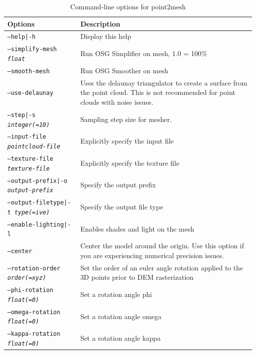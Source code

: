 \begin{longtable}{|l|p{10cm}|}
\caption{Command-line options for point2mesh}
\label{tbl:point2mesh}
\endfirsthead
\endhead
\endfoot
\endlastfoot
\hline
Options & Description \\ \hline \hline
\texttt{--help|-h} & Display this help \\ \hline
\texttt{--simplify-mesh \textit{float}} & Run OSG Simplifier on mesh, 1.0 = 100\% \\ \hline
\texttt{--smooth-mesh} & Run OSG Smoother on mesh \\ \hline
\texttt{--use-delaunay} & Uses the delaunay triangulator to create a surface from the point cloud. This is not recommended for point clouds with noise issues. \\ \hline
\texttt{--step|-s \textit{integer(=10)}} & Sampling step size for mesher. \\ \hline
\texttt{--input-file \textit{pointcloud-file}} & Explicitly specify the input file \\ \hline
\texttt{--texture-file \textit{texture-file}} & Explicitly specify the texture file \\ \hline
\texttt{--output-prefix|-o \textit{output-prefix}} & Specify the output prefix \\ \hline
\texttt{--output-filetype|-t \textit{type(=ive)}} & Specify the output file type \\ \hline
\texttt{--enable-lighting|-l} & Enables shades and light on the mesh \\ \hline
\texttt{--center} & Center the model around the origin. Use this option if you are experiencing numerical precision issues. \\ \hline
\texttt{--rotation-order \textit{order(=xyz)}} & Set the order of an euler angle rotation applied to the 3D points prior to DEM rasterization \\ \hline
\texttt{--phi-rotation \textit{float(=0)}} & Set a rotation angle phi \\ \hline
\texttt{--omega-rotation \textit{float(=0)}} & Set a rotation angle omega \\ \hline
\texttt{--kappa-rotation \textit{float(=0)}} & Set a rotation angle kappa \\ \hline
\end{longtable}


